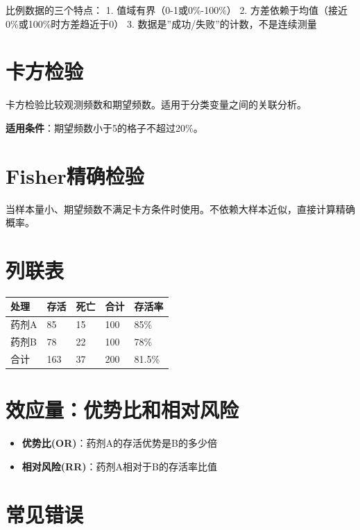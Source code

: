 \documentclass[
  letterpaper,
]{scrbook}
\newcounter{none} %
\providecommand{\tightlist}{%
  \setlength{\itemsep}{0pt}\setlength{\parskip}{0pt}}
\begin{document}
比例数据的三个特点： 1. 值域有界（0-1或0\%-100\%） 2.
方差依赖于均值（接近0\%或100\%时方差趋近于0） 3.
数据是''成功/失败''的计数，不是连续测量

\section{卡方检验}\label{ux5361ux65b9ux68c0ux9a8c}

卡方检验比较观测频数和期望频数。适用于分类变量之间的关联分析。

\textbf{适用条件}：期望频数小于5的格子不超过20\%。

\section{Fisher精确检验}\label{fisherux7cbeux786eux68c0ux9a8c}

当样本量小、期望频数不满足卡方条件时使用。不依赖大样本近似，直接计算精确概率。

\section{列联表}\label{ux5217ux8054ux8868}

{\def\LTcaptype{none} %
\begin{longtable}[]{@{}lllll@{}}
\toprule\noalign{}
处理 & 存活 & 死亡 & 合计 & 存活率 \\
\midrule\noalign{}
\endhead
\bottomrule\noalign{}
\endlastfoot
药剂A & 85 & 15 & 100 & 85\% \\
药剂B & 78 & 22 & 100 & 78\% \\
合计 & 163 & 37 & 200 & 81.5\% \\
\end{longtable}
}

\section{效应量：优势比和相对风险}\label{ux6548ux5e94ux91cfux4f18ux52bfux6bd4ux548cux76f8ux5bf9ux98ceux9669}

\begin{itemize}
\tightlist
\item
  \textbf{优势比(OR)}：药剂A的存活优势是B的多少倍
\item
  \textbf{相对风险(RR)}：药剂A相对于B的存活率比值
\end{itemize}

\section{常见错误}\label{ux5e38ux89c1ux9519ux8bef-7}
\end{document}
